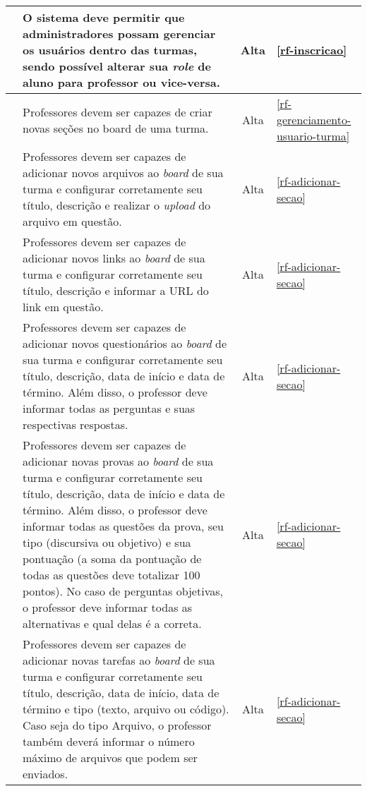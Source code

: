 \begin{longtable}{|c|p{10cm}|c|p{2cm}|}
	\RF\label{rf-gerenciamento-usuario-turma}  & O sistema deve permitir que administradores possam gerenciar os usuários dentro das turmas, sendo possível alterar sua \textit{role} de aluno para professor ou vice-versa. & Alta & \ref{rf-inscricao} \\
	\hline 
	
	\RF\label{rf-adicionar-secao}  & Professores devem ser capazes de criar novas seções no board de uma turma. & Alta & \ref{rf-gerenciamento-usuario-turma} \\
	\hline 
	
	\RF\label{rf-adicionar-arquivo}  & Professores devem ser capazes de adicionar novos arquivos ao \textit{board} de sua turma e configurar corretamente seu título, descrição e realizar o \textit{upload} do arquivo em questão. & Alta & \ref{rf-adicionar-secao} \\
	\hline 
	 
	\RF\label{rf-adicionar-link}  & Professores devem ser capazes de adicionar novos links ao \textit{board} de sua turma e configurar corretamente seu título, descrição e informar a URL do link em questão. & Alta & \ref{rf-adicionar-secao} \\
	\hline  
	 
	\RF\label{rf-adicionar-questionario}  & Professores devem ser capazes de adicionar novos questionários ao \textit{board} de sua turma e configurar corretamente seu título, descrição, data de início e data de término. Além disso, o professor deve informar todas as perguntas e suas respectivas respostas. & Alta & \ref{rf-adicionar-secao} \\
	\hline  
	
	\RF\label{rf-adicionar-prova}  & Professores devem ser capazes de adicionar novas provas ao \textit{board} de sua turma e configurar corretamente seu título, descrição, data de início e data de término. Além disso, o professor deve informar todas as questões da prova, seu tipo (discursiva ou objetivo) e sua pontuação (a soma da pontuação de todas as questões deve totalizar 100 pontos). No caso de perguntas objetivas, o professor deve informar todas as alternativas e qual delas é a correta. & Alta & \ref{rf-adicionar-secao} \\
	\hline  
	
	\RF\label{rf-adicionar-tarefa}  & Professores devem ser capazes de adicionar novas tarefas ao \textit{board} de sua turma e configurar corretamente seu título, descrição, data de início, data de término e tipo (texto, arquivo ou código). Caso seja do tipo Arquivo, o professor também deverá informar o número máximo de arquivos que podem ser enviados. & Alta & \ref{rf-adicionar-secao} \\
	\hline  
	

\end{longtable}
